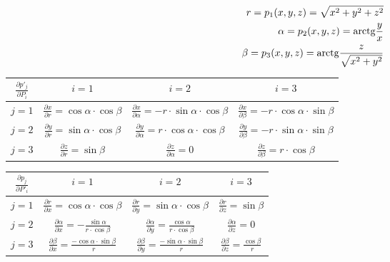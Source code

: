 \begin{equation}
\begin{split}
r = p_1(x, y, z) = \sqrt{x^2 + y^2 + z^2} \\
\alpha = p_2(x, y, z) = \mathrm{arctg} \frac{y}{x} \\
\beta = p_3(x, y, z) = \mathrm{arctg} \frac{z}{\sqrt{x^2 + y^2}}
\end{split}
\end{equation}

\begin{tabular}{| c || c | c | c |}
\hline
\(\frac{\partial p'_j}{\partial P_i}\) & \(i=1\) & \(i=2\) & \(i=3\) \\
\hline
\hline
\(j=1\) & \(\frac{\partial x}{\partial r} = \cos \alpha \cdot \cos \beta\) & \(\frac{\partial x}{\partial \alpha} = -r \cdot \sin \alpha \cdot \cos \beta\) & \(\frac{\partial x}{\partial \beta} = -r \cdot \cos \alpha \cdot \sin \beta\) \\
\hline
\(j=2\) & \(\frac{\partial y}{\partial r} = \sin \alpha \cdot \cos \beta\) & \(\frac{\partial y}{\partial \alpha} = r \cdot \cos \alpha \cdot \cos \beta\) & \(\frac{\partial y}{\partial \beta} = -r \cdot \sin \alpha \cdot \sin \beta\) \\
\hline
\(j=3\) & \(\frac{\partial z}{\partial r} = \sin \beta\) & \(\frac{\partial z}{\partial \alpha} = 0\) & \(\frac{\partial z}{\partial \beta} = r \cdot \cos \beta\) \\
\hline
\end{tabular}

\begin{tabular}{| c || c | c | c |}
\hline
\(\frac{\partial p_j}{\partial P'_i}\) & \(i=1\) & \(i=2\) & \(i=3\)\\
\hline
\hline
\(j=1\) & \(\frac{\partial r}{\partial x} = \cos \alpha \cdot \cos \beta\) & \(\frac{\partial r}{\partial y} = \sin \alpha \cdot \cos \beta\) & \(\frac{\partial r}{\partial z} = \sin \beta\)\\
\hline
\(j=2\) & \(\frac{\partial \alpha}{\partial x} = -\frac{\sin \alpha}{r \cdot \cos \beta}\) & \(\frac{\partial \alpha}{\partial y} = \frac{\cos \alpha}{r \cdot \cos \beta}\) & \(\frac{\partial \alpha}{\partial z} = 0\)\\
\hline
\(j=3\) & \(\frac{\partial \beta}{\partial x} = \frac{-\cos \alpha \cdot \sin \beta}{r}\) & \(\frac{\partial \beta}{\partial y} = \frac{-\sin \alpha \cdot  \sin \beta}{r}\) & \(\frac{\partial \beta}{\partial z} = \frac{\cos \beta}{r}\)\\
\hline
\end{tabular}


